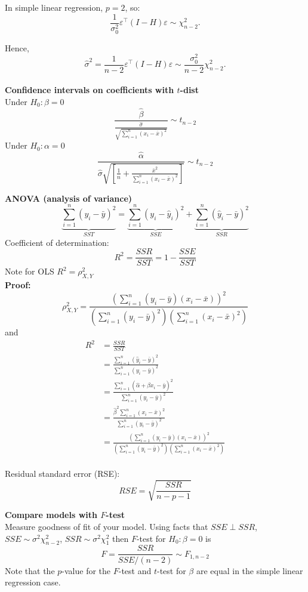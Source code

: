 \documentclass{article}
\begin{document}
In simple linear regression, \( p = 2 \), so:
\[
  \frac{1}{\sigma_0^2}\varepsilon^\top (I - H)\varepsilon \sim \chi^2_{n - 2}.
\]

Hence,
\[
  \hat{\sigma}^2 = \frac{1}{n - 2} \varepsilon^\top (I - H)\varepsilon \sim \frac{\sigma_0^2}{n - 2} \chi^2_{n - 2}.
\]\\

\textbf{Confidence intervals on coefficients with $t$-dist}\\
Under $H_0: \beta = 0$
\[ \frac{\hat{\beta}}{\frac{\hat{\sigma}}{\sqrt{\sum_{i=1}^{n}(x_i - \bar{x})^2}}} \sim t_{n-2} \]
Under $H_0: \alpha = 0$
\[ \frac{\hat{\alpha}}{\hat{\sigma}\sqrt{\left[ \frac{1}{n} + \frac{\bar{x}^2}{\sum_{i=1}^{n}(x_i - \bar{x})^2}\right]}} \sim t_{n-2} \]

\textbf{ANOVA (analysis of variance)}\\
\[ \underbrace{\sum_{i=1}^{n} (y_i - \bar{y})^2}_{SST} = \underbrace{\sum_{i=1}^{n} (y_i - \hat{y}_i)^2}_{SSE} + \underbrace{\sum_{i=1}^{n} (\hat{y}_i - \bar{y})^2}_{SSR}\]
Coefficient of determination:
\[ R^2 = \frac{SSR}{SST} = 1 - \frac{SSE}{SST} \]
Note for OLS $R^2 = \rho^2_{X, Y}$ \\
\textbf{Proof:}
\[ \rho^2_{X, Y} =  \frac{(\sum_{i=1}^{n}(y_i - \bar{y})(x_i - \bar{x}))^2}{(\sum_{i=1}^{n} (y_i - \bar{y})^2)(\sum_{i=1}^{n} (x_i - \bar{x})^2)}\]
and
\begin{align*}
  R^2 &= \frac{SSR}{SST}\\
  &= \frac{\sum_{i=1}^{n} (\hat{y}_i - \bar{y})^2}{\sum_{i=1}^{n} (y_i - \bar{y})^2} \\
  &= \frac{\sum_{i=1}^{n} (\hat{\alpha} + \hat{\beta}x_i - \bar{y})^2}{\sum_{i=1}^{n} (y_i - \bar{y})^2} \\
  &= \frac{\hat{\beta}^2 \sum_{i=1}^{n} (x_i - \bar{x})^2}{\sum_{i=1}^{n} (y_i - \bar{y})^2} \\
  &= \frac{(\sum_{i=1}^{n}(y_i - \bar{y})(x_i - \bar{x}))^2}{(\sum_{i=1}^{n} (y_i - \bar{y})^2)(\sum_{i=1}^{n} (x_i - \bar{x})^2)}
\end{align*}
\\
Residual standard error (RSE): \[ RSE = \sqrt{\frac{SSR}{n - p - 1}} \]

\textbf{Compare models with $F$-test}\\
Measure goodness of fit of your model. Using facts that $SSE \perp SSR$,
$SSE \sim \sigma^2 \chi^2_{n-2}$, $SSR \sim \sigma^2 \chi^2_{1}$ then
$F$-test for $H_0: \beta=0$ is
\[ F = \frac{SSR}{SSE/(n-2)} \sim F_{1, n-2}\]
Note that the $p$-value for the $F$-test and $t$-test for $\beta$ are equal in the simple linear regression case.\\
\end{document}
